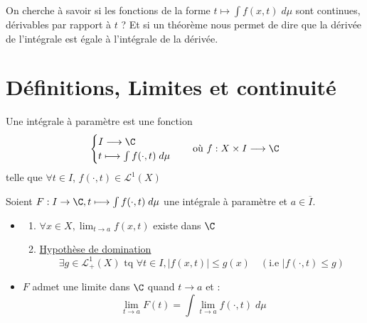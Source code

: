 \minitoc  %


On cherche à savoir si les fonctions de la forme $t \longmapsto \int f(x,t) \; d \mu$ sont continues, dérivables par rapport à $t$ ?
Et si un théorème nous permet de dire que la dérivée de l'intégrale est égale à l'intégrale de la dérivée. 

\section{Définitions, Limites et continuité}

\begin{definition}
    Une intégrale à paramètre est une fonction 
    \[ 
        \begin{cases}
            I \longrightarrow \C \\
            t \longmapsto \int f(\cdot, t) \; d \mu 
        \end{cases}
    \quad \text{où } f : X \times I \longrightarrow \C \]
    telle que $\forall t \in I $, $f(\cdot, t) \in \mathcal{L}^1(X) $
\end{definition}

\begin{theorem}
    Soient $F : I \rightarrow \C, t \longmapsto \int f(\cdot, t) \; d \mu $ une intégrale à paramètre et $a \in \overline{I}$.
    \begin{itemize}
        \item[\textbf{si}] \begin{enumerate}
                        \item $\forall x \in X, \lim_{t \to a} f(x,t)$ existe dans $\C$
                        \item \underline{Hypothèse de domination}
                            \[ \exists g \in \mathcal{L}_+^1(X) \text{ tq } \forall t \in I, |f(x,t)| \leq g(x) \quad (\text{i.e } |f(\cdot, t) \leq g) \]
                     \end{enumerate}
        \item[\textbf{alors}] $F$ admet une limite dans $\C$ quand $t \to a$ et :
                \[ \boxed{ \lim_{t\to a} F(t) = \int \lim_{t\to a} f(\cdot, t) \; d \mu } \] 
    \end{itemize}
\end{theorem}

